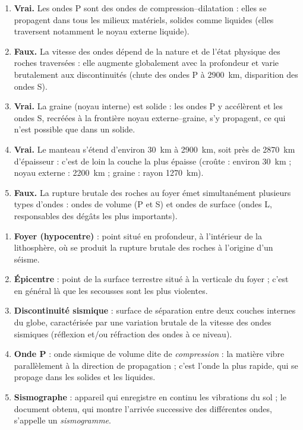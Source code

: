 \documentclass[11pt]{article}
\begin{document}
\begin{corrige}
\begin{enumerate}
\item \textbf{Vrai.} Les ondes P sont des ondes de compression--dilatation : elles se propagent dans tous les milieux matériels, solides comme liquides (elles traversent notamment le noyau externe liquide).
\item \textbf{Faux.} La vitesse des ondes dépend de la nature et de l'état physique des roches traversées : elle augmente globalement avec la profondeur et varie brutalement aux discontinuités (chute des ondes P à \SI{2900}{km}, disparition des ondes S).
\item \textbf{Vrai.} La graine (noyau interne) est solide : les ondes P y accélèrent et les ondes S, recréées à la frontière noyau externe--graine, s'y propagent, ce qui n'est possible que dans un solide.
\item \textbf{Vrai.} Le manteau s'étend d'environ \SI{30}{km} à \SI{2900}{km}, soit près de \SI{2870}{km} d'épaisseur : c'est de loin la couche la plus épaisse (croûte : environ \SI{30}{km} ; noyau externe : \SI{2200}{km} ; graine : rayon \SI{1270}{km}).
\item \textbf{Faux.} La rupture brutale des roches au foyer émet simultanément plusieurs types d'ondes : ondes de volume (P et S) et ondes de surface (ondes L, responsables des dégâts les plus importants).
\end{enumerate}
\end{corrige}

\begin{corrige}
\begin{enumerate}
\item \textbf{Foyer (hypocentre)} : point situé en profondeur, à l'intérieur de la lithosphère, où se produit la rupture brutale des roches à l'origine d'un séisme.
\item \textbf{Épicentre} : point de la surface terrestre situé à la verticale du foyer ; c'est en général là que les secousses sont les plus violentes.
\item \textbf{Discontinuité sismique} : surface de séparation entre deux couches internes du globe, caractérisée par une variation brutale de la vitesse des ondes sismiques (réflexion et/ou réfraction des ondes à ce niveau).
\item \textbf{Onde P} : onde sismique de volume dite de \emph{compression} : la matière vibre parallèlement à la direction de propagation ; c'est l'onde la plus rapide, qui se propage dans les solides et les liquides.
\item \textbf{Sismographe} : appareil qui enregistre en continu les vibrations du sol ; le document obtenu, qui montre l'arrivée successive des différentes ondes, s'appelle un \emph{sismogramme}.
\end{enumerate}
\end{corrige}
\end{document}
